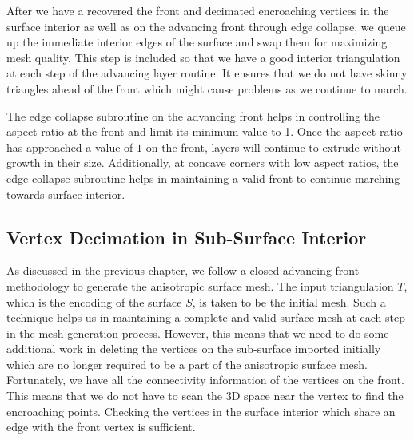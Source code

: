 After we have a recovered the front and decimated encroaching vertices in the surface interior as well as on the advancing front through edge collapse, we queue up the immediate interior edges of the surface and swap them for maximizing mesh quality. This step is included so that we have a good interior triangulation at each step of the advancing layer routine. It ensures that we do not have skinny triangles ahead of the front which might cause problems as we continue to march.

The edge collapse subroutine on the advancing front helps in controlling the aspect ratio at the front and limit its minimum value to 1. Once the aspect ratio has approached a value of $1$ on the front, layers will continue to extrude without growth in their size. Additionally, at concave corners with low aspect ratios, the edge collapse subroutine helps in maintaining a valid front to continue marching towards surface interior.

\subsection{Vertex Decimation in Sub-Surface Interior}

As discussed in the previous chapter, we follow a closed advancing front methodology to generate the anisotropic surface mesh. The input triangulation $T$, which is the encoding of the surface $S$, is taken to be the initial mesh. Such a technique helps us in maintaining a complete and valid surface mesh at each step in the mesh generation process. However, this means that we need to do some additional work in deleting the vertices on the sub-surface imported initially which are no longer required to be a part of the anisotropic surface mesh. Fortunately, we have all the connectivity information of the vertices on the front. This means that we do not have to scan the 3D space near the vertex to find the encroaching points. Checking the vertices in the surface interior which share an edge with the front vertex is sufficient.

